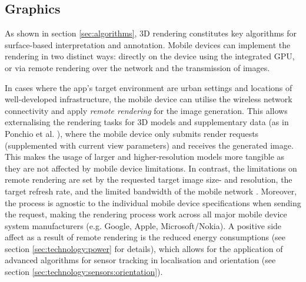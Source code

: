 \documentclass[review]{elsarticle}
\begin{document}
\subsection{Graphics}
\label{sec:technology:graphics}

As shown in section \ref{sec:algorithms}, 3D rendering constitutes key algorithms for surface-based interpretation and annotation. Mobile devices can implement the rendering in two distinct ways: directly on the device using the integrated \gls{GPU}, or via remote rendering over the network and the transmission of images.

In cases where the app's target environment are urban settings and locations of well-developed infrastructure, the mobile device can utilise the wireless network connectivity and apply \textit{remote rendering} for the image generation. This allows externalising the rendering tasks for 3D models and supplementary data (as in Ponchio et al. \cite{Ponchio2016}), where the mobile device only submits render requests (supplemented with current view parameters) and receives the generated image. This makes the usage of larger and higher-resolution models more tangible as they are not affected by mobile device limitations. In contrast, the limitations on remote rendering are set by the requested target image size- and resolution, the target refresh rate, and the limited bandwidth of the mobile network \cite{Ponchio2016,Evans2014}. Moreover, the process is agnostic to the individual mobile device specifications when sending the request, making the rendering process work across all major mobile device system manufacturers (e.g. Google, Apple, Microsoft/Nokia). A positive side affect as a result of remote rendering is the reduced energy consumptions (see section \ref{sec:technology:power} for details), which allows for the application of advanced algorithms for sensor tracking in localisation and orientation (see section \ref{sec:technology:sensors:orientation}).
\end{document}
